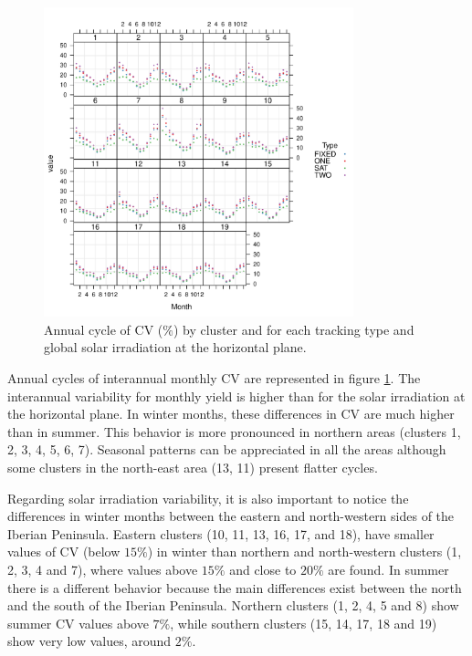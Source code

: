 \begin{figure}
\includegraphics[width=0.8\textwidth]{figs/capitulo5/ciclo_anual_byCluster_all2}
\caption[Annual cycle of CV by cluster and tracking type over the Iberian Peninsula]{Annual cycle of CV ($\%$) by cluster and for each tracking type and global solar irradiation at the horizontal plane.}
\label{cicloAnualCV_all}
\end{figure}

Annual cycles of interannual monthly CV are represented in figure \ref{cicloAnualCV_all}. The interannual variability for monthly yield is higher than for the solar irradiation at the horizontal plane. In winter months, these differences in CV are much higher than in summer. This behavior is more pronounced in northern areas (clusters 1, 2, 3, 4, 5, 6, 7).  Seasonal patterns can be appreciated in all the areas although some clusters in the north-east area (13, 11) present flatter cycles.

Regarding solar irradiation variability, it is also important to notice the differences in winter months between the eastern and north-western sides of the Iberian Peninsula. Eastern clusters (10, 11, 13, 16, 17, and 18), have smaller values of CV (below $15\%$) in winter than northern and north-western clusters (1, 2, 3, 4 and 7), where values above $15\%$ and close to $20\%$ are found. In summer there is a different behavior because the main differences exist between the north and the south of the Iberian Peninsula. Northern clusters (1, 2, 4, 5 and 8) show summer CV values above $7\%$, while southern clusters (15, 14, 17, 18 and 19) show very low values, around $2\%$.

